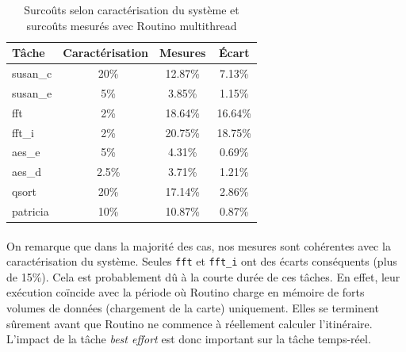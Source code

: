 \begin{table}[H]
\centering
\begin{tabular}{l|c|c||c}
Tâche & Caractérisation & Mesures & \'Ecart\\
\hline
susan\_c & ~20\% & 12.87\% & 7.13\%\\
susan\_e & ~5\%  & 3.85\%  & 1.15\%\\
fft      & ~2\%  & 18.64\% & 16.64\%\\
fft\_i   & ~2\%  & 20.75\% & 18.75\%\\
aes\_e   & ~5\%  & 4.31\%  & 0.69\%\\
aes\_d   & ~2.5\%& 3.71\%  & 1.21\%\\
qsort    & ~20\% & 17.14\% & 2.86\%\\
patricia & ~10\% & 10.87\% & 0.87\%\\
\end{tabular}
\caption{Surcoûts selon caractérisation du système et surcoûts mesurés avec
Routino multithread}
\label{carac}
\end{table}

\paragraph{}
On remarque que dans la majorité des cas, nos mesures sont cohérentes avec la
caractérisation du système. Seules \texttt{fft} et \texttt{fft\_i} ont des
écarts conséquents (plus de 15\%). Cela est probablement dû à la courte durée
de ces tâches. En effet, leur exécution coïncide avec la période où
Routino charge en mémoire de forts volumes de données (chargement de la carte)
uniquement. Elles se terminent sûrement avant que Routino ne commence à 
réellement calculer l'itinéraire. L'impact de la tâche \textit{best effort} est
donc important sur la tâche temps-réel.
